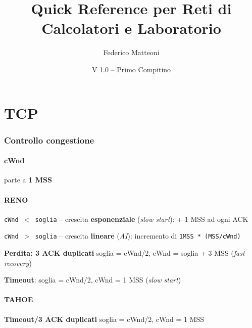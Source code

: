 \documentclass[12pt]{article}
\begin{document}
\title{Quick Reference per Reti di Calcolatori e Laboratorio}
\author{Federico Matteoni}
\date{V 1.0 -- Primo Compitino}
\renewcommand*\contentsname{Indice}

\maketitle

\section{TCP}
\subsubsection{Controllo congestione}
\paragraph{cWnd} parte a \textbf{1 MSS}
\paragraph{RENO} \begin{list}{-}{}
\item \texttt{cWnd $<$ soglia} -- crescita \textbf{esponenziale} (\textit{slow start}): + 1 MSS ad ogni ACK
\item \texttt{cWnd $>$ soglia} -- crescita \textbf{lineare} (\textit{AI}): incremento di \texttt{1MSS * (MSS/cWnd)}
\item \textbf{Perdita: 3 ACK duplicati} soglia = cWnd/2, cWnd = soglia + 3 MSS (\textit{fast recovery})
\item \textbf{Timeout}: soglia = cWnd/2, cWnd = 1 MSS (\textit{slow start})
\end{list}
\paragraph{TAHOE} \begin{list}{-}{}
\item \textbf{Timeout/3 ACK duplicati} soglia = cWnd/2, cWnd = 1 MSS
\end{list}
\end{document}
